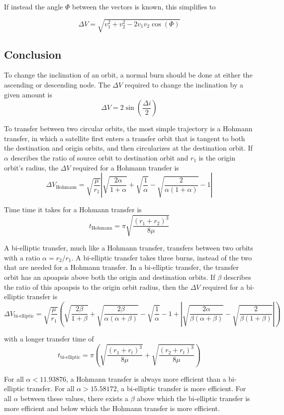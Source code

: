 \documentclass{article}
\begin{document}
If instead the angle $\varPhi$ between the vectors is known, this simplifies to

\begin{equation}
    \Delta V = \sqrt{v_1^2+v_2^2-2v_1v_2\cos(\varPhi)}
\end{equation}

\bigskip\bigskip
\subsection{Conclusion}

\bigskip
To change the inclination of an orbit, a normal burn should be done at either the ascending or descending node. The $\Delta V$ required to change the inclination by a given amount is
$$\Delta V=2\sin\left(\frac{\Delta i}{2}\right)$$

\bigskip
To transfer between two circular orbits, the most simple trajectory is a Hohmann transfer, in which a satellite first enters a transfer orbit that is tangent to both the destination and origin orbits, and then circularizes at the destination orbit. If $\alpha$ describes the ratio of source orbit to destination orbit and $r_1$ is the origin orbit's radius, the $\Delta V$ required for a Hohmann transfer is
$$\Delta V_\text{Hohmann} = \sqrt{\frac{\mu}{r_1}}\left|\sqrt{\frac{2\alpha}{1+\alpha}}+\sqrt{\frac{1}{\alpha}}-\sqrt{\frac{2}{\alpha(1+\alpha)}}-1\right|$$

Time time it takes for a Hohmann transfer is
$$t_\text{Hohmann}=\pi\sqrt{\frac{(r_1+r_2)^3}{8\mu}}$$

\bigskip
A bi-elliptic transfer, much like a Hohmann transfer, transfers between two orbits with a ratio $\alpha=r_2/r_1$. A bi-elliptic transfer takes three burns, instead of the two that are needed for a Hohmann transfer. In a bi-elliptic transfer, the transfer orbit has an apoapsis above both the origin and destination orbits. If $\beta$ describes the ratio of this apoapsis to the origin orbit radius, then the $\Delta V$ required for a bi-elliptic transfer is
$$\Delta V_\text{bi-elliptic} = \sqrt{\frac{\mu}{r_1}}\left(\sqrt{\frac{2\beta}{1+\beta}}+\sqrt{\frac{2\beta}{\alpha(\alpha+\beta)}}-\sqrt{\frac{1}{\alpha}}-1+\left|\sqrt{\frac{2\alpha}{\beta(\alpha+\beta)}}-\sqrt{\frac{2}{\beta(1+\beta)}}\right|\right)$$

with a longer transfer time of
$$t_\text{bi-elliptic}=\pi\left(\sqrt{\frac{(r_1+r_t)^3}{8\mu}}+\sqrt{\frac{(r_2+r_t)^3}{8\mu}}\right)$$

For all $\alpha<11.93876$, a Hohmann transfer is always more efficient than a bi-elliptic transfer. For all $\alpha>15.58172$, a bi-elliptic transfer is more efficient. For all $\alpha$ between these values, there exists a $\beta$ above which the bi-elliptic transfer is more efficient and below which the Hohmann transfer is more efficient.
\end{document}
